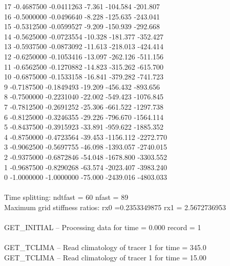 17  -0.4687500  -0.0411263          -7.361    -104.584    -201.807\\
16  -0.5000000  -0.0496640          -8.228    -125.635    -243.041\\
15  -0.5312500  -0.0599527          -9.209    -150.939    -292.668\\
14  -0.5625000  -0.0723554         -10.328    -181.377    -352.427\\
13  -0.5937500  -0.0873092         -11.613    -218.013    -424.414\\
12  -0.6250000  -0.1053416         -13.097    -262.126    -511.156\\
11  -0.6562500  -0.1270882         -14.823    -315.262    -615.700\\
10  -0.6875000  -0.1533158         -16.841    -379.282    -741.723\\
9  -0.7187500  -0.1849493         -19.209    -456.432    -893.656\\
8  -0.7500000  -0.2231040         -22.002    -549.423   -1076.845\\
7  -0.7812500  -0.2691252         -25.306    -661.522   -1297.738\\
6  -0.8125000  -0.3246355         -29.226    -796.670   -1564.114\\
5  -0.8437500  -0.3915923         -33.891    -959.622   -1885.352\\
4  -0.8750000  -0.4723564         -39.453   -1156.112   -2272.770\\
3  -0.9062500  -0.5697755         -46.098   -1393.057   -2740.015\\
2  -0.9375000  -0.6872846         -54.048   -1678.800   -3303.552\\
1  -0.9687500  -0.8290268         -63.574   -2023.407   -3983.240\\
0  -1.0000000  -1.0000000         -75.000   -2439.016   -4803.033\\
\\
Time splitting: ndtfast = 60    nfast = 89\\
Maximum grid stiffness ratios:   rx0 =0.2353349875  rx1 =  2.5672736953\\
\\
GET\_INITIAL -- Processing data for time =   0.000     record =   1\\
\\
GET\_TCLIMA -- Read climatology of tracer   1 for time =    345.0 \\
GET\_TCLIMA -- Read climatology of tracer   1 for time =    15.00 \\
